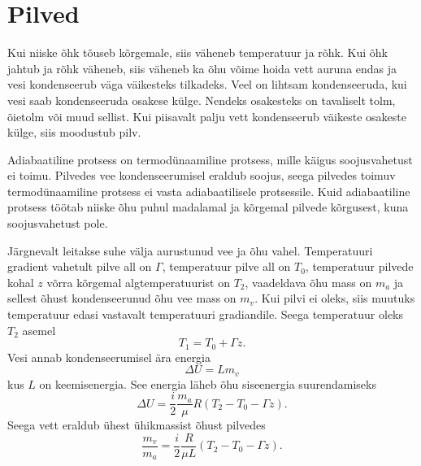 \documentclass{trkut}%
\begin{document}
\section{Pilved}
Kui niiske õhk tõuseb kõrgemale, siis väheneb temperatuur ja rõhk. Kui õhk jahtub ja rõhk väheneb, siis väheneb ka õhu võime hoida vett auruna endas ja vesi kondenseerub väga väikesteks tilkadeks. Veel on lihtsam kondenseeruda, kui vesi saab kondenseeruda osakese külge. Nendeks osakesteks on tavaliselt tolm, õietolm või muud sellist. Kui piisavalt palju vett kondenseerub väikeste osakeste külge, siis moodustub pilv.

Adiabaatiline protsess on termodünaamiline protsess, mille käigus soojusvahetust ei toimu. Pilvedes vee kondenseerumisel eraldub soojus, seega pilvedes toimuv termodünaamiline protsess ei vasta adiabaatilisele protsessile. Kuid adiabaatiline protsess töötab niiske õhu puhul madalamal ja kõrgemal pilvede kõrgusest, kuna soojusvahetust pole.

Järgnevalt leitakse suhe välja aurustunud vee ja õhu vahel. Temperatuuri gradient vahetult pilve all on $\Gamma$, temperatuur pilve all on $T_0$, temperatuur pilvede kohal $z$ võrra kõrgemal algtemperatuurist on $T_2$, vaadeldava õhu mass on $m_a$ ja sellest õhust kondenseerunud õhu vee mass on $m_v$. Kui pilvi ei oleks, siis muutuks temperatuur edasi vastavalt temperatuuri gradiandile. Seega temperatuur oleks $T_2$ asemel
\begin{equation*}
T_1 = T_0 + \Gamma z.
\end{equation*}
Vesi annab kondenseerumisel ära energia
\begin{equation*}
\Delta U = L m_v
\end{equation*}
kus $L$ on keemisenergia. See energia läheb õhu siseenergia suurendamiseks
\begin{equation*}
\Delta U = \frac{i}{2}\frac{m_a}{\mu}R\left(T_2 - T_0 - \Gamma z\right).
\end{equation*}
Seega vett eraldub ühest ühikmassist õhust pilvedes
\begin{equation*}
\frac{m_v}{m_a} = \frac{i}{2}\frac{R}{\mu L}\left(T_2- T_0 - \Gamma z\right).
\end{equation*}
\end{document}
